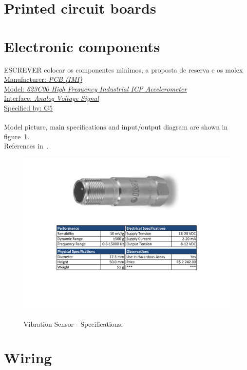 \section{Printed circuit boards}
\section{Electronic components}
ESCREVER colocar os componentes minimos, a proposta de reserva e os molex
\underline{Manufacturer: \emph{PCB (IMI)}}\\
\underline{Model: \emph{623C00 High Frequency Industrial ICP Accelerometer}}\\
\underline{Interface: \emph{Analog Voltage Signal}}\\
\underline{Specified by: G5}\\
\\
Model picture, main specifications and input/output diagram are shown in figure~\ref{FIG:VIBSENSOR}.\\
References in~\cite{Model2013PCB}.
\begin{figure}[H]
  \centering
  \includegraphics[width=1\columnwidth]{figs/tables/vibsensor.pdf}\\
  \caption[Vibration Sensor - Specifications]{Vibration Sensor - Specifications.}
  \label{FIG:VIBSENSOR}
\end{figure}
\newpage


\section{Wiring}
